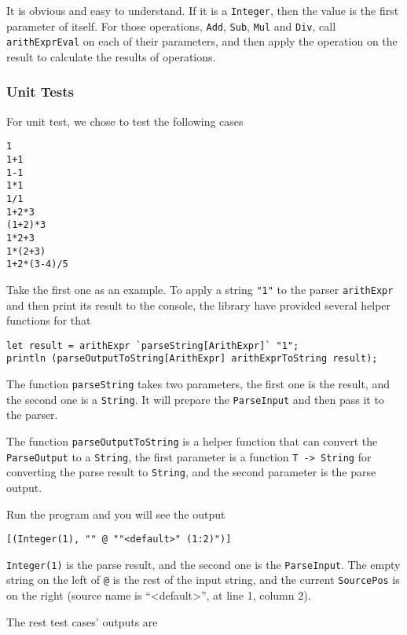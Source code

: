 It is obvious and easy to understand. If it is a \texttt{Integer}, then the value is the first parameter of itself. For those operations, \texttt{Add}, \texttt{Sub}, \texttt{Mul} and \texttt{Div}, call \texttt{arithExprEval} on each of their parameters, and then apply the operation on the result to calculate the results of operations.

\subsubsection{Unit Tests}

For unit test, we chose to test the following cases

\begin{lstlisting}[language={}]
1
1+1
1-1
1*1
1/1
1+2*3
(1+2)*3
1*2+3
1*(2+3)
1+2*(3-4)/5
\end{lstlisting}

Take the first one as an example. To apply a string \texttt{"1"} to the parser \texttt{arithExpr} and then print its result to the console, the library have provided several helper functions for that

\begin{lstlisting}
let result = arithExpr `parseString[ArithExpr]` "1";
println (parseOutputToString[ArithExpr] arithExprToString result);
\end{lstlisting}

The function \texttt{parseString} takes two parameters, the first one is the result, and the second one is a \texttt{String}. It will prepare the \texttt{ParseInput} and then pass it to the parser.

The function \texttt{parseOutputToString} is a helper function that can convert the \texttt{ParseOutput} to a \texttt{String}, the first parameter is a function \texttt{T -> String} for converting the parse result to \texttt{String}, and the second parameter is the parse output.

Run the program and you will see the output

\begin{lstlisting}
[(Integer(1), "" @ ""<default>" (1:2)")]
\end{lstlisting}

\texttt{Integer(1)} is the parse result, and the second one is the \texttt{ParseInput}. The empty string on the left of \texttt{@} is the rest of the input string, and the current \texttt{SourcePos} is on the right (source name is ``<default>'', at line 1, column 2).

The rest test cases' outputs are

